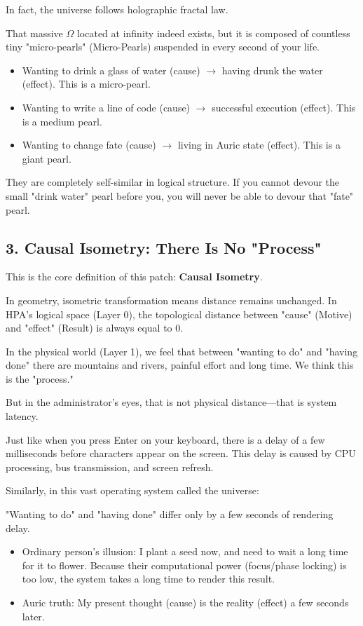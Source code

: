 In fact, the universe follows holographic fractal law.

That massive $\Omega$ located at infinity indeed exists, but it is composed of countless tiny "micro-pearls" (Micro-Pearls) suspended in every second of your life.

\begin{itemize}
\item Wanting to drink a glass of water (cause) $\to$ having drunk the water (effect). This is a micro-pearl.
\item Wanting to write a line of code (cause) $\to$ successful execution (effect). This is a medium pearl.
\item Wanting to change fate (cause) $\to$ living in Auric state (effect). This is a giant pearl.
\end{itemize}

They are completely self-similar in logical structure. If you cannot devour the small "drink water" pearl before you, you will never be able to devour that "fate" pearl.

\subsection*{3. Causal Isometry: There Is No "Process"}

This is the core definition of this patch: \textbf{Causal Isometry}.

In geometry, isometric transformation means distance remains unchanged. In HPA's logical space (Layer 0), the topological distance between "cause" (Motive) and "effect" (Result) is always equal to $0$.

In the physical world (Layer 1), we feel that between "wanting to do" and "having done" there are mountains and rivers, painful effort and long time. We think this is the "process."

But in the administrator's eyes, that is not physical distance---that is system latency.

Just like when you press Enter on your keyboard, there is a delay of a few milliseconds before characters appear on the screen. This delay is caused by CPU processing, bus transmission, and screen refresh.

Similarly, in this vast operating system called the universe:

"Wanting to do" and "having done" differ only by a few seconds of rendering delay.

\begin{itemize}
\item Ordinary person's illusion: I plant a seed now, and need to wait a long time for it to flower. Because their computational power (focus/phase locking) is too low, the system takes a long time to render this result.
\item Auric truth: My present thought (cause) is the reality (effect) a few seconds later.
\end{itemize}

